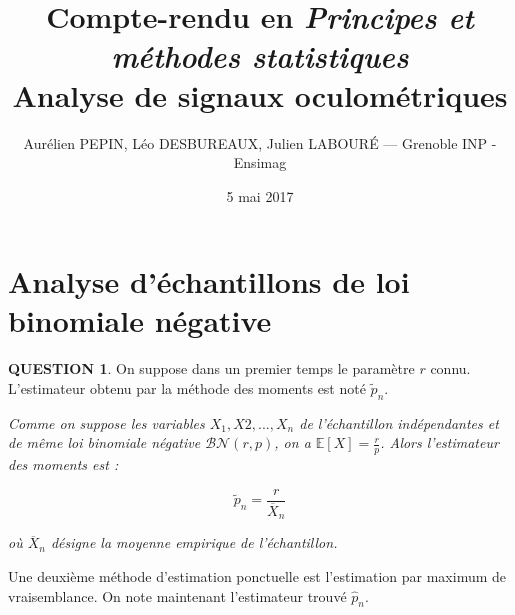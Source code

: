 \documentclass[a4paper,11pt]{article}
\title{Compte-rendu en \textit{Principes et méthodes statistiques} \\
\textbf{Analyse de signaux oculométriques}}
\author{Aurélien PEPIN, Léo DESBUREAUX, Julien LABOUR\'{E} --- Grenoble INP - Ensimag}
\date{5 mai 2017}
\newcommand{\quest}[1]{\small\textbf{#1}\normalsize}
\theoremstyle{nonumberplain}
\theoremstyle{nonumberplain}
\theoremstyle{nonumberplain}
\theoremstyle{nonumberplain}
\begin{document}
\maketitle

\section{Analyse d'échantillons de loi binomiale négative}

    \quest{QUESTION 1}. On suppose dans un premier temps le paramètre $r$ connu. L'estimateur
    obtenu par la méthode des moments est noté $\tilde{p}_n$.

    \begin{calculs}
        \hspace{-1ex}\emph{Comme on suppose les variables $X_1, X2, ..., X_n$ de l'échantillon indépendantes
        et de même loi binomiale négative $\mathcal{BN}(r, p)$, on a $\mathbb{E}[X] = \frac{r}{p}$. Alors
        l'estimateur des moments est :}

        $$\tilde{p}_n = \frac{r}{\overline{X}_n}$$

        \emph{où $\overline{X}_n$ désigne la moyenne empirique de l'échantillon.}
    \end{calculs}

    Une deuxième méthode d'estimation ponctuelle est l'estimation par maximum de
    vraisemblance. On note maintenant l'estimateur trouvé $\hat{p}_n$.
\end{document}
